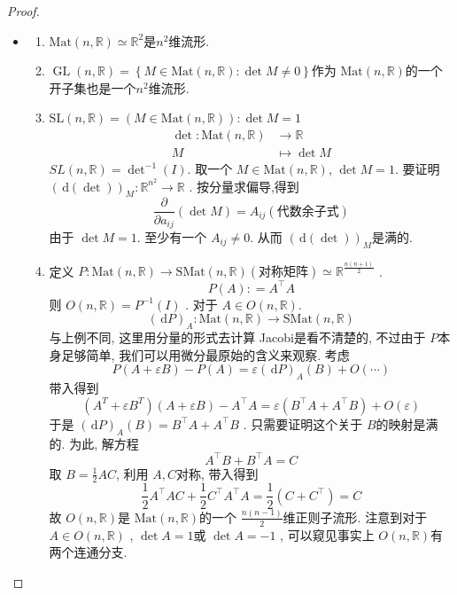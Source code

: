 \documentclass[../main.tex]{subfiles}
\begin{document}
\begin{proof}
\begin{itemize}
\item 
  \begin{enumerate}
    \item \(  \mathrm{Mat}\left( n,\mathbb{R}  \right)\simeq \mathbb{R} ^{2}   \)是\(  n^{2}  \)维流形.  
    \item \(  \operatorname{GL} \left( n,\mathbb{R}  \right)= \left\{ M\in \mathrm{Mat}\left( n,\mathbb{R}  \right):\det M\neq 0  \right\}   \)作为 \(  \mathrm{Mat}\left( n,\mathbb{R}  \right)   \)的一个开子集也是一个\(  n^{2}  \)维流形.    
    \item  \(  \mathrm{SL}\left( n,\mathbb{R}  \right)= \left( M\in \mathrm{Mat}\left( n,\mathbb{R}  \right)  \right):\det M= 1    \)   \[
    \begin{aligned}
    \det : \mathrm{Mat}\left( n,\mathbb{R}  \right)&\to \mathbb{R} \\ 
     M&\mapsto \det M  
    \end{aligned}
    \]  \(  SL  \left( n,\mathbb{R}  \right)= \det ^{-1} \left( I \right)  \). 取一个 \(  M \in \mathrm{Mat}\left( n,\mathbb{R}  \right)   \), \(  \det M= 1  \). 要证明 \(  \left( \,\mathrm{d} \left( \det  \right)  \right)_{M}: \mathbb{R} ^{n^{2}}\to \mathbb{R}    \)   . 按分量求偏导,得到 \[
    \frac{\partial }{\partial a_{ij}} \left( \det M \right)=  A_{ij}(\text{代数余子式})  
    \]由于 \(  \det M= 1  \).  至少有一个 \(  A_{ij}\neq 0  \). 从而  \(  \left( \,\mathrm{d} \left( \det  \right)  \right)_{M}   \)是满的. 
  \item 定义 \(  P: \mathrm{Mat}\left( n,\mathbb{R}  \right)\to  \mathrm{SMat}\left( n,\mathbb{R}  \right)(\text{对称矩阵}) \simeq \mathbb{R} ^{\frac{n\left( n+ 1 \right)  }{2 } }   \) .  \[
  P\left( A \right): = A^{\top}A 
  \]则 \(  O\left( n,\mathbb{R}  \right)= P^{-1} \left( I \right)   \) . 对于 \(  A \in O\left( n,\mathbb{R}  \right)   \). \[
  \left( \,\mathrm{d} P \right)_{A}: \mathrm{Mat}\left( n,\mathbb{R}  \right)\to \mathrm{SMat}\left( n,\mathbb{R}  \right)   
  \]与上例不同, 这里用分量的形式去计算 Jacobi是看不清楚的, 不过由于 \(  P  \)本身足够简单, 我们可以用微分最原始的含义来观察. 考虑  \[
  P\left( A+  \varepsilon B \right)-P\left( A \right)=  \varepsilon \left( \,\mathrm{d} P \right)_{A}\left( B \right)+ O\left(  \cdots   \right)     
  \]带入得到 \[
  \left( A^{T}+  \varepsilon B^{T} \right)\left( A+  \varepsilon B \right)-A^{\top}A=    \varepsilon \left(B^{\top}A+ A^{\top}B \right)+ O\left(  \varepsilon  \right)  
  \]于是 \(  \left( \,\mathrm{d} P \right)_{A}   \left( B \right)= B ^{\top}A+ A^{\top}B\) . 只需要证明这个关于 \(  B  \)的映射是满的. 为此, 解方程 \[
  A^{\top}B+ B^{\top}A= C
  \] 取 \(  B = \frac{1}{2}AC  \), 利用 \(  A,C  \)对称,   带入得到 \[
  \frac{1}{2}A^{\top}AC+ \frac{1}{2}C^{\top}A^{\top}A= \frac{1}{2}\left( C+ C^{\top} \right)= C 
  \]  
  故 \(  O\left( n,\mathbb{R}  \right)   \)是 \(  \mathrm{Mat}\left( n,\mathbb{R}  \right)   \)的一个 \(  \frac{n\left( n-1 \right)  }{2 }   \)维正则子流形. 注意到对于 \(  A \in O\left( n,\mathbb{R}  \right)   \) , \(  \det A= 1  \)或 \(  \det A= -1  \) , 可以窥见事实上 \(  O\left( n,\mathbb{R}  \right)   \)有两个连通分支.  
  \end{enumerate}
  

\end{itemize}
\end{proof}
\end{document}
